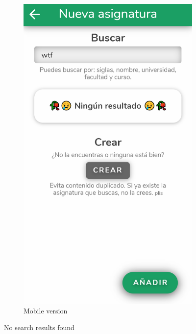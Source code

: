 \begin{figure}[ht!]
\begin{subfigure}[b]{0.243\textwidth-0.1cm}
        \includegraphics[frame,width=\textwidth]{media/screenshots/screenshot-search-nothing.png}
        \caption{Mobile version}
    \end{subfigure}
    \caption{No search results found}
    \label{fig:search-nothing}
\end{figure}
\vfill


